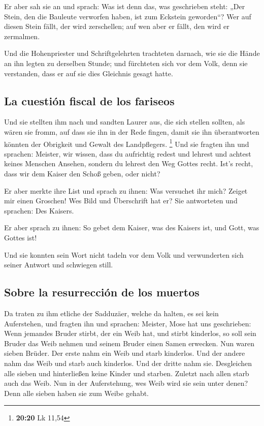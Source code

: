  Er aber sah sie an und sprach: Was ist denn das, was
geschrieben steht: „Der Stein, den die Bauleute verworfen haben, ist zum
Eckstein geworden``?  Wer auf diesen Stein fällt, der
wird zerschellen; auf wen aber er fällt, den wird er zermalmen.

 Und die Hohenpriester und Schriftgelehrten trachteten
darnach, wie sie die Hände an ihn legten zu derselben Stunde; und
fürchteten sich vor dem Volk, denn sie verstanden, dass er auf sie dies
Gleichnis gesagt hatte.

\hypertarget{la-cuestiuxf3n-fiscal-de-los-fariseos}{%
\subsection{La cuestión fiscal de los
fariseos}\label{la-cuestiuxf3n-fiscal-de-los-fariseos}}

 Und sie stellten ihm nach und sandten Laurer aus, die
sich stellen sollten, als wären sie fromm, auf dass sie ihn in der Rede
fingen, damit sie ihn überantworten könnten der Obrigkeit und Gewalt des
Landpflegers. \footnote{\textbf{20:20} Lk 11,54}  Und sie
fragten ihn und sprachen: Meister, wir wissen, dass du aufrichtig redest
und lehrest und achtest keines Menschen Ansehen, sondern du lehrest den
Weg Gottes recht.  Ist's recht, dass wir dem Kaiser den
Schoß geben, oder nicht?

 Er aber merkte ihre List und sprach zu ihnen: Was
versuchet ihr mich?  Zeiget mir einen Groschen! Wes Bild
und Überschrift hat er? Sie antworteten und sprachen: Des Kaisers.

 Er aber sprach zu ihnen: So gebet dem Kaiser, was des
Kaisers ist, und Gott, was Gottes ist!

 Und sie konnten sein Wort nicht tadeln vor dem Volk und
verwunderten sich seiner Antwort und schwiegen still.

\hypertarget{sobre-la-resurrecciuxf3n-de-los-muertos}{%
\subsection{Sobre la resurrección de los
muertos}\label{sobre-la-resurrecciuxf3n-de-los-muertos}}

 Da traten zu ihm etliche der Sadduzäer, welche da
halten, es sei kein Auferstehen, und fragten ihn  und
sprachen: Meister, Mose hat uns geschrieben: Wenn jemandes Bruder
stirbt, der ein Weib hat, und stirbt kinderlos, so soll sein Bruder das
Weib nehmen und seinem Bruder einen Samen erwecken.  Nun
waren sieben Brüder. Der erste nahm ein Weib und starb kinderlos.
 Und der andere nahm das Weib und starb auch kinderlos.
 Und der dritte nahm sie. Desgleichen alle sieben und
hinterließen keine Kinder und starben.  Zuletzt nach
allen starb auch das Weib.  Nun in der Auferstehung, wes
Weib wird sie sein unter denen? Denn alle sieben haben sie zum Weibe
gehabt.

